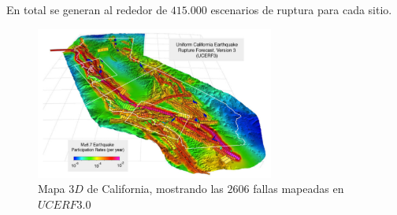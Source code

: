 \begin{frame}[allowframebreaks]
%
En total se generan al rededor de $415.000$ escenarios de ruptura para cada sitio. 
%
%
%
\begin{figure}[h]
	\centering
	\includegraphics[height=5cm]{img/UCERF3_Map.pdf}
	\caption{Mapa $3D$ de California, mostrando las $2606$ fallas mapeadas en $UCERF3.0$ \cite[figura 1, página 5]{ucerf3}}
\end{figure}
%
\end{frame}
%
%
